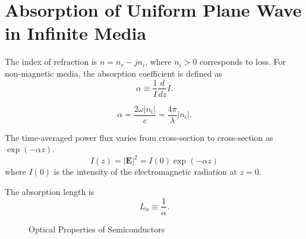 \documentclass[12pt]{article}
\begin{document}
\section{Absorption of Uniform Plane Wave in Infinite Media}

The index of refraction is $n = n_r - j n_i$, where $n_i > 0$ corresponds to loss.  
For non-magnetic media, the absorption coefficient is defined as 
\begin{equation}
\alpha \equiv \frac{1}{I} \frac{d}{dz} I.
\end{equation}

\begin{equation}
\boxed{\alpha = \frac {2 \omega | n_i |}{c} = \frac{4 \pi}{\lambda}  | n_i | }.
\end{equation}

The time-averaged power flux varies from cross-section to cross-section as $\exp(-\alpha z)$.  
\begin{equation}
I(z) = | \textbf{E} | ^2 = I(0) \exp(-\alpha z)
\end{equation}
where $I(0)$ is the intensity of the electromagnetic radiation at $z = 0$.  

The absorption length is 
\begin{equation}
\boxed{L_\alpha \equiv \frac{1}{\alpha}}.
\end{equation}

\begin{figure}[H]
\centering
\vspace{-10pt}
 \hspace{5pt}
 \caption[Absorption Coefficient and Absorption Length versus Energy]{Optical Properties of Semiconductors}
  \label{fig:leadingThermoelectrics}
\end{figure}
\end{document}
